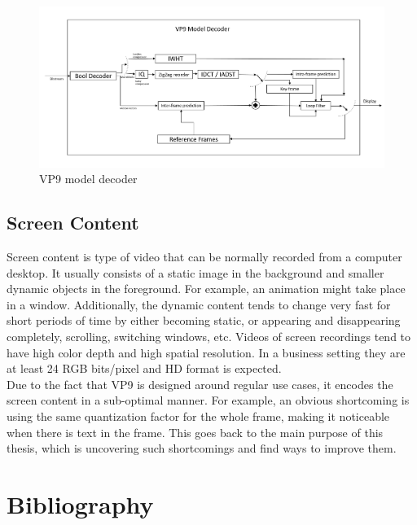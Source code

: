 \documentclass[a4paper,11pt,oneside]{article}
\begin{document}
\begin{figure}[h]
  \centering
  \includegraphics[width=\textwidth]{../figures/vp9_decoder(1).pdf}
  \caption{VP9 model decoder}
  \label{figure:vp9_decoder}
\end{figure} 
\subsection{Screen Content}
\indent Screen content is type of video that can be normally recorded from a computer desktop. It usually consists of a static image in the background and smaller dynamic objects in the foreground. For example, an animation might take place in a window. Additionally, the dynamic content tends to change very fast for short periods of time by either becoming static, or appearing and disappearing completely, scrolling, switching windows, etc. 
Videos of screen recordings tend to have high color depth and high spatial resolution. In a business setting they are at least 24 RGB bits/pixel and HD format is expected. \\
\indent Due to the fact that VP9 is designed around regular use cases, it encodes the screen content in a sub-optimal manner. For example, an obvious shortcoming is using the same quantization factor for the whole frame, making it noticeable when there is text in the frame. This goes back to the main purpose of this thesis, which is
uncovering such shortcomings and find ways to improve them.  





\newpage
\section*{Bibliography}
\printbibliography
\end{document}
